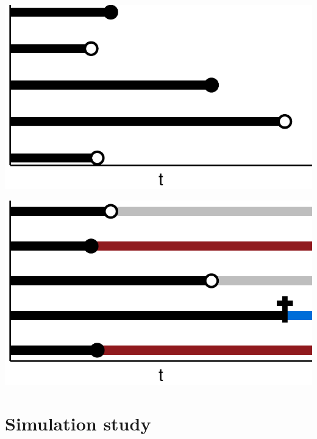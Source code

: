 \documentclass[11pt]{article}
\begin{document}
\begin{center}
\includegraphics[width=.9\linewidth]{./multi-state-data-2.pdf}
\end{center}

\begin{center}
\includegraphics[width=.9\linewidth]{./multi-state-data-3.pdf}
\end{center}

\section{Simulation study}
\label{sec:org4dbd4e5}
\end{document}

